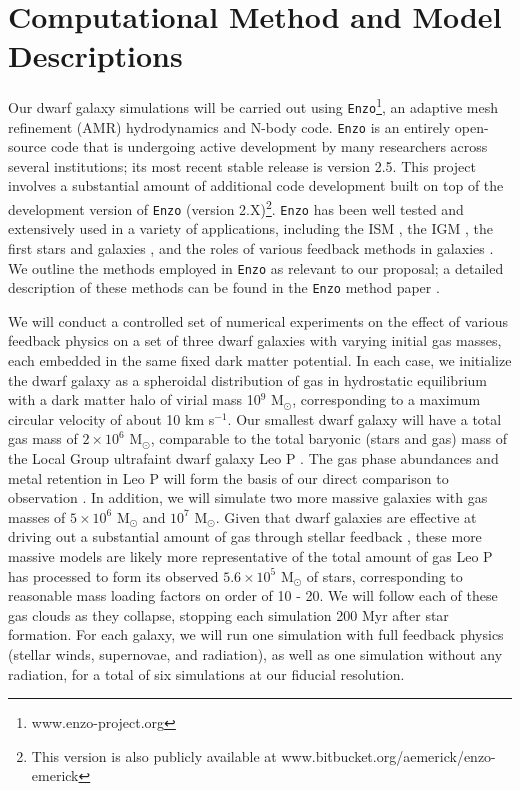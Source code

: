 \documentclass[11pt]{article}
\newcommand{\eg}{e.g.,}
\begin{document}
\section{Computational Method and Model Descriptions}

Our dwarf galaxy simulations will be carried out using \texttt{Enzo}\footnote{www.enzo-project.org}, an adaptive mesh refinement (AMR) hydrodynamics and N-body code. \texttt{Enzo} is an entirely open-source code that is undergoing active development by many researchers across several institutions; its most recent stable release is version 2.5. This project involves a substantial amount of additional code development built on top of the development version of \texttt{Enzo} (version 2.X)\footnote{This version is also publicly available at www.bitbucket.org/aemerick/enzo-emerick}. \texttt{Enzo} has been well tested and extensively used in a variety of applications, including the ISM \citep{2005MNRAS.356..737S, 2008ApJ...673..810T}, the IGM \citep{2000ApJ...534...57B, 2001ApJ...561L..31F}, the first stars and galaxies \citep[\eg][]{Wise2012a, WiseAbel2012, Wise2014}, and the roles of various feedback methods in galaxies \citep[\eg][]{Simpson2015, SalemBryan2014, Goldbaum2016, Forbes2016}. We outline the methods employed in \texttt{Enzo} as relevant to our proposal; a detailed description of these methods can be found in the \texttt{Enzo} method paper \citep{Enzo2014}. 

We will conduct a controlled set of numerical experiments on the effect of various feedback physics on a set of three dwarf galaxies with varying initial gas masses, each embedded in the same fixed dark matter potential. In each case, we initialize the dwarf galaxy as a spheroidal distribution of gas in hydrostatic equilibrium with a dark matter halo of virial mass 10$^{9}$ M$_{\odot}$, corresponding to a maximum circular velocity of about 10 km s$^{-1}$. Our smallest dwarf galaxy will have a total gas mass of $2 \times 10^{6}$ M$_{\odot}$, comparable to the total baryonic (stars and gas) mass of the Local Group ultrafaint dwarf galaxy Leo P \citep{McQuinn2013, Giovanelli2013, Skillman2013, McQuinn2015}. The gas phase abundances and metal retention in Leo P will form the basis of our direct comparison to observation \citep{McQuinn2015}. In addition, we will simulate two more massive galaxies with gas masses of $5 \times 10^{6}$ M$_{\odot}$ and $10^{7}$ M$_{\odot}$. Given that dwarf galaxies are effective at driving out a substantial amount of gas through stellar feedback \citep[e.g.][]{MacLowFerrara1999}, these more massive models are likely more representative of the total amount of gas Leo P has processed to form its observed $5.6\times 10^{5}$ M$_{\odot}$ of stars, corresponding to reasonable mass loading factors on order of 10 - 20. We will follow each of these gas clouds as they collapse, stopping each simulation 200 Myr after star formation. For each galaxy, we will run one simulation with full feedback physics (stellar winds, supernovae, and radiation), as well as one simulation without any radiation, for a total of six simulations at our fiducial resolution.
\end{document}
